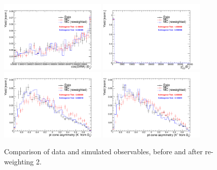 \begin{figure}[h!]
\includegraphics[height=6.cm,width=0.45\textwidth]{figs/MC-v-Data/Ds_DIRA_OWNPV.pdf}
\includegraphics[height=6.cm,width=0.45\textwidth]{figs/MC-v-Data/Ds_FDCHI2_ORIVX.pdf}\\
\includegraphics[height=6.cm,width=0.45\textwidth]{figs/MC-v-Data/K_minus_fromDs_ptasy_1_00.pdf}
\includegraphics[height=6.cm,width=0.45\textwidth]{figs/MC-v-Data/K_plus_fromDs_ptasy_1_00.pdf}
\caption{Comparison of data and simulated observables, before and after re-weighting 2.}
\end{figure}

